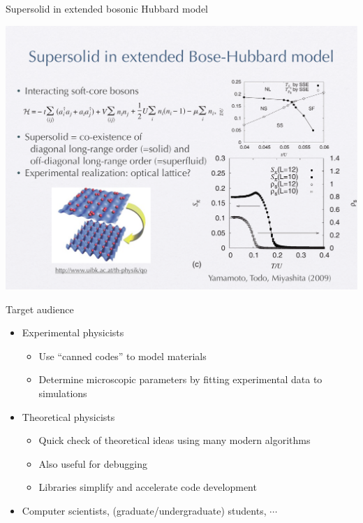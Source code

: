 \begin{frame}[fragile]{Supersolid in extended bosonic Hubbard model}
  \begin{center}
    \includegraphics[height=.8\textheight]{supersolid.pdf}
  \end{center}
\end{frame}

\begin{frame}[t,fragile]{Target audience}
  \begin{itemize}
    \setlength{\itemsep}{1em}
  \item Experimental physicists
    \begin{itemize}
    \item Use ``canned codes'' to model materials
    \item Determine microscopic parameters by fitting experimental data to simulations
    \end{itemize}
  \item Theoretical physicists
    \begin{itemize}
    \item Quick check of theoretical ideas using many modern algorithms
    \item Also useful for debugging
    \item Libraries simplify and accelerate code development
    \end{itemize}
  \item Computer scientists, (graduate/undergraduate) students, $\cdots$
  \end{itemize}
\end{frame}

